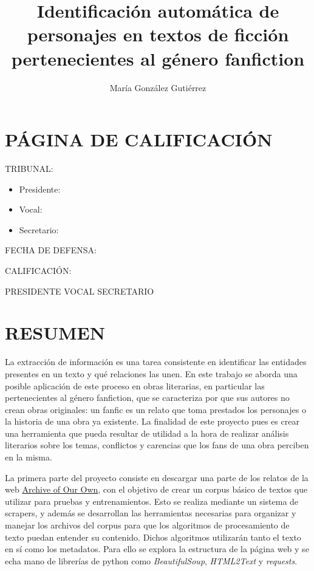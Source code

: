 \documentclass{pre-tfg}
\title{Identificación automática de personajes en textos de ficción pertenecientes al género fanfiction}
\author{María González Gutiérrez}
\begin{document}
\maketitle

\tableofcontents

\cleardoublepage

\clearpage

\cleardoublepage
\section{PÁGINA DE CALIFICACIÓN}
TRIBUNAL:
\begin{itemize}
	\item Presidente:
	\item Vocal:
	\item Secretario:
\end{itemize}
\vspace{1cm}

FECHA DE DEFENSA:


CALIFICACIÓN:

\vspace{14cm}

\small{PRESIDENTE} \hspace{4cm} \small{VOCAL}\hspace{4cm} \small{SECRETARIO}


\cleardoublepage

\section{RESUMEN}


La extracción de información es una tarea consistente en identificar las entidades presentes en un texto y qué relaciones las unen. En este trabajo se aborda una posible aplicación de este proceso en obras literarias, en particular las pertenecientes al género fanfiction, que se caracteriza por que sus autores no crean obras originales: un fanfic es un relato que toma prestados los personajes o la historia de una obra ya existente. La finalidad de este proyecto pues es crear una herramienta que pueda resultar de utilidad a la hora de realizar análisis literarios sobre los temas, conflictos y carencias que los fans de una obra perciben en la misma.

La primera parte del proyecto consiste en descargar una parte de los relatos de la web \href{http://www.archiveofourown.org}{Archive of Our Own}, con el objetivo de crear un corpus básico de textos que utilizar para pruebas y entrenamientos. Esto se realiza mediante un sistema de scrapers, y además se desarrollan las herramientas necesarias para organizar y manejar los archivos del corpus para que los algoritmos de procesamiento de texto puedan entender su contenido. Dichos algoritmos utilizarán tanto el texto en sí como los metadatos. Para ello se explora la estructura de la página web y se echa mano de librerías de python como \textit{BeautifulSoup}, \textit{HTML2Text} y \textit{requests}.
\end{document}
